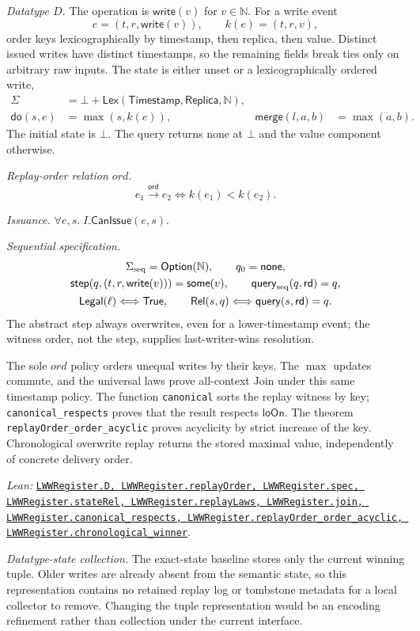 \documentclass[11pt]{article}
\theoremstyle{definition}
\newcommand{\N}{\mathbb N}
\newcommand{\State}{\Sigma}
\newcommand{\doop}{\mathsf{do}}
\newcommand{\merge}{\mathsf{merge}}
\newcommand{\ord}{\mathrel{\xrightarrow{\mathsf{ord}}}}
\newcommand{\loOn}{\mathsf{loOn}}
\newcommand{\lean}[1]{\texttt{#1}}
\newcommand{\src}[2]{\href{../../#1}{\texttt{#2}}}
\newcommand{\anchor}[2]{\par\smallskip\noindent\emph{Lean: }\src{#1}{#2}.}
\begin{document}
\emph{Datatype $D$.} The operation is $\mathsf{write}(v)$ for $v\in\N$. For a write event
\[
 e=(t,r,\mathsf{write}(v)),\qquad k(e)=(t,r,v),
\]
order keys lexicographically by timestamp, then replica, then value.
Distinct issued writes have distinct timestamps, so the remaining fields
break ties only on arbitrary raw inputs.
The state is either unset or a lexicographically ordered write,
\[
\begin{aligned}
 \State&=\bot+\mathsf{Lex}(\mathsf{Timestamp},\mathsf{Replica},\N),\\
 \doop(s,e)&=\max(s,k(e)),&
 \merge(l,a,b)&=\max(a,b).
\end{aligned}
\]
The initial state is $\bot$. The query returns none at $\bot$ and the
value component otherwise.

\emph{Replay-order relation $ord$.}
\[
 e_1\ord e_2\Longleftrightarrow k(e_1)<k(e_2).
\]

\emph{Issuance.} $\forall e,s.\;I.\mathsf{CanIssue}(e,s)$.

\emph{Sequential specification.}
\[
\begin{gathered}
 \Sigma_{\rm seq}=\mathsf{Option}(\N),\qquad q_0=\mathsf{none},\\
 \mathsf{step}(q,(t,r,\mathsf{write}(v)))=\mathsf{some}(v),\qquad
 \mathsf{query}_{\rm seq}(q,\mathsf{rd})=q,\\
 \mathsf{Legal}(\ell)\Longleftrightarrow\mathsf{True},\qquad
 \mathsf{Rel}(s,q)\Longleftrightarrow\mathsf{query}(s,\mathsf{rd})=q.
\end{gathered}
\]
The abstract step always overwrites, even for a lower-timestamp event;
the witness order, not the step, supplies last-writer-wins resolution.

The sole $ord$ policy orders unequal writes by their keys. The $\max$
updates commute, and the universal laws prove all-context Join under this
same timestamp policy. The function
\lean{canonical} sorts the replay witness by key;
\lean{canonical\_respects} proves that the result respects $\loOn$.
The theorem \lean{replayOrder\_order\_acyclic} proves acyclicity by strict increase of
the key. Chronological overwrite replay returns the stored maximal value,
independently of concrete delivery order.
\anchor{Sal/MRDTs/Instances/LWWRegister.lean}
  {LWWRegister.D, LWWRegister.replayOrder, LWWRegister.spec,
   LWWRegister.stateRel, LWWRegister.replayLaws, LWWRegister.join,
   LWWRegister.canonical\_respects,
   LWWRegister.replayOrder\_order\_acyclic, LWWRegister.chronological\_winner}

\emph{Datatype-state collection.} The exact-state baseline stores only the current winning tuple. Older writes
are already absent from the semantic state, so this representation contains
no retained replay log or tombstone metadata for a local collector to remove.
Changing the tuple representation would be an encoding refinement rather than
collection under the current interface.
\end{document}
